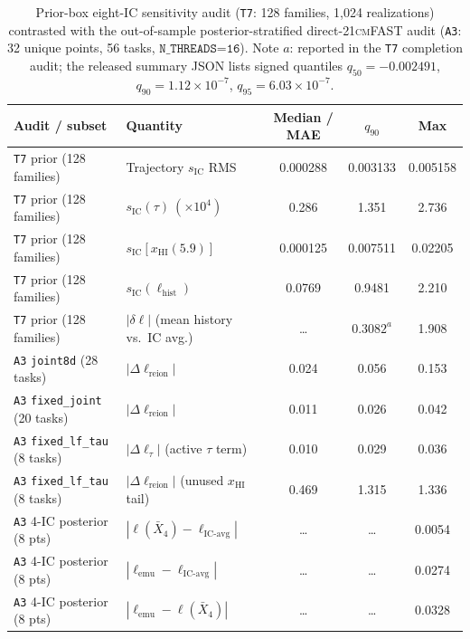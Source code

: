 \documentclass[aps,prd,reprint,superscriptaddress,nofootinbib,amsmath,amssymb,floatfix,longbibliography]{revtex4-2}
\begin{document}
\begin{table}[!tb]
\caption{Prior-box eight-IC sensitivity audit (\texttt{T7}: 128 families, 1,024 realizations) contrasted with the out-of-sample posterior-stratified direct-\textsc{21cmFAST} audit (\texttt{A3}: 32 unique points, 56 tasks, $\texttt{N\_THREADS=16}$). Note $a$: reported in the \texttt{T7} completion audit; the released summary JSON lists signed quantiles $q_{50}=-0.002491$, $q_{90}=1.12\times 10^{-7}$, $q_{95}=6.03\times 10^{-7}$.}
\label{tab:t7_a3}
\begin{ruledtabular}
\begin{tabular}{llccc}
Audit / subset & Quantity & Median / MAE & $q_{90}$ & Max \\
\hline
\texttt{T7} prior (128 families) & Trajectory $s_{\mathrm{IC}}$ RMS & 0.000288 & 0.003133 & 0.005158 \\
\texttt{T7} prior (128 families) & $s_{\mathrm{IC}}(\tau)\ (\times 10^4)$ & 0.286 & 1.351 & 2.736 \\
\texttt{T7} prior (128 families) & $s_{\mathrm{IC}}[x_{\mathrm{HI}}(5.9)]$ & 0.000125 & 0.007511 & 0.02205 \\
\texttt{T7} prior (128 families) & $s_{\mathrm{IC}}(\ell_{\mathrm{hist}})$ & 0.0769 & 0.9481 & 2.210 \\
\texttt{T7} prior (128 families) & $|\delta\ell|$ (mean history vs.\ IC avg.) & \dots & $0.3082^{a}$ & 1.908 \\
\hline
\texttt{A3} \texttt{joint8d} (28 tasks) & $|\Delta\ell_{\mathrm{reion}}|$ & 0.024 & 0.056 & 0.153 \\
\texttt{A3} \texttt{fixed\_joint} (20 tasks) & $|\Delta\ell_{\mathrm{reion}}|$ & 0.011 & 0.026 & 0.042 \\
\texttt{A3} \texttt{fixed\_lf\_tau} (8 tasks) & $|\Delta\ell_{\tau}|$ (active $\tau$ term) & 0.010 & 0.029 & 0.036 \\
\texttt{A3} \texttt{fixed\_lf\_tau} (8 tasks) & $|\Delta\ell_{\mathrm{reion}}|$ (unused $x_{\mathrm{HI}}$ tail) & 0.469 & 1.315 & 1.336 \\
\texttt{A3} 4-IC posterior (8 pts) & $|\ell(\bar{X}_4)-\ell_{\mathrm{IC\text{-}avg}}|$ & \dots & \dots & 0.0054 \\
\texttt{A3} 4-IC posterior (8 pts) & $|\ell_{\mathrm{emu}}-\ell_{\mathrm{IC\text{-}avg}}|$ & \dots & \dots & 0.0274 \\
\texttt{A3} 4-IC posterior (8 pts) & $|\ell_{\mathrm{emu}}-\ell(\bar{X}_4)|$ & \dots & \dots & 0.0328 \\
\end{tabular}
\end{ruledtabular}
\end{table}
\end{document}
